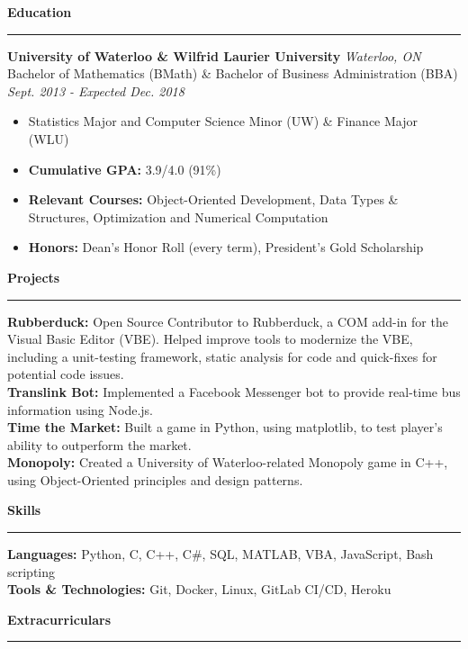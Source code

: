 \documentclass{letter}
\begin{document}
	\begin{flushleft}
		{\Large \textbf{Education}}
		\rule[5pt]{\textwidth}{0.4pt}
		{\large \textbf{University of Waterloo \& Wilfrid Laurier University}} \hfill \textit{Waterloo, ON}\\
		Bachelor of Mathematics (BMath) \& Bachelor of Business Administration (BBA) \hfill \textit{Sept. 2013 - Expected Dec. 2018}
		\vspace{-7.5pt}
		\begin{itemize}
			\item Statistics Major and Computer Science Minor (UW) \& Finance Major (WLU) \vspace{-3pt}
			\item \textbf{Cumulative GPA:} 3.9/4.0 (91\%) \vspace{-3pt}
			\item \textbf{Relevant Courses:} Object-Oriented Development, Data Types \& Structures, Optimization and Numerical Computation \vspace{-3pt}
			\item \textbf{Honors:} Dean's Honor Roll (every term), President's Gold Scholarship
		\end{itemize}
	\end{flushleft}

	\begin{flushleft}
		{\Large \textbf{Projects}}
		\rule[5pt]{\textwidth}{0.4pt}
		\textbf{Rubberduck:} Open Source Contributor to Rubberduck, a COM add-in for the Visual Basic Editor (VBE). Helped improve tools to modernize the VBE, including a unit-testing framework, static analysis for code and quick-fixes for potential code issues.\\
		\textbf{Translink Bot:} Implemented a Facebook Messenger bot to provide real-time bus information using Node.js.\\
		\textbf{Time the Market:} Built a game in Python, using matplotlib, to test player's ability to outperform the market.\\
		\textbf{Monopoly:} Created a University of Waterloo-related Monopoly game in C++, using Object-Oriented principles and design patterns.
	\end{flushleft}
	
	\begin{flushleft}
		{\Large \textbf{Skills}}
		\rule[5pt]{\textwidth}{0.4pt}
		\textbf{Languages:} Python, C, C++, C\#, SQL, MATLAB, VBA, JavaScript, Bash scripting\\
		\textbf{Tools \& Technologies:} Git, Docker, Linux, GitLab CI/CD, Heroku
	\end{flushleft}

	\begin{flushleft}
		{\Large \textbf{Extracurriculars}}
		\rule[5pt]{\textwidth}{0.4pt}
		
	\end{flushleft}
\end{document}
